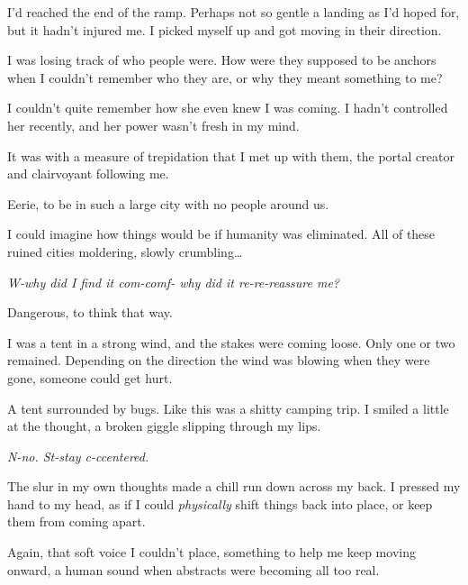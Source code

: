 I'd reached the end of the ramp.  Perhaps not so gentle a landing as I'd hoped for, but it hadn't injured me.  I picked myself up and got moving in their direction.



I was losing track of who people were.  How were they supposed to be anchors when I couldn't remember who they are, or why they meant something to me?



I couldn't quite remember how she even knew I was coming.  I hadn't controlled her recently, and her power wasn't fresh in my mind.



It was with a measure of trepidation that I met up with them, the portal creator and clairvoyant following me.



Eerie, to be in such a large city with no people around us.



I could imagine how things would be if humanity was eliminated.  All of these ruined cities moldering, slowly crumbling\ldots



\emph{W-why did I find it com-comf- why did it re-re-reassure me?}



Dangerous, to think that way.



I was a tent in a strong wind, and the stakes were coming loose.  Only one or two remained.  Depending on the direction the wind was blowing when they were gone, someone could get hurt.



A tent surrounded by bugs.  Like this was a shitty camping trip.  I smiled a little at the thought, a broken giggle slipping through my lips.



\emph{N-no.  St-stay c-ccentered.}



The slur in my own thoughts made a chill run down across my back.  I pressed my hand to my head, as if I could \emph{physically} shift things back into place, or keep them from coming apart.



Again, that soft voice I couldn't place, something to help me keep moving onward, a human sound when abstracts were becoming all too real.




